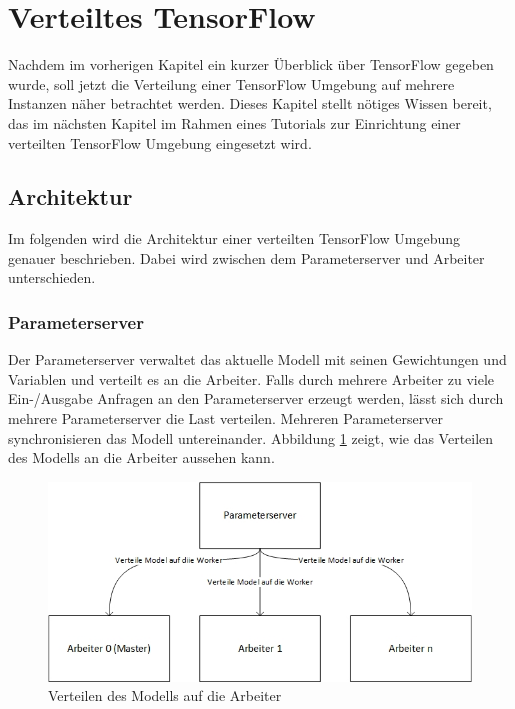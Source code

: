 \section{Verteiltes TensorFlow}
Nachdem im vorherigen Kapitel ein kurzer Überblick über TensorFlow gegeben wurde, soll jetzt die Verteilung einer TensorFlow Umgebung auf mehrere Instanzen näher betrachtet werden. Dieses Kapitel stellt nötiges Wissen bereit, das im nächsten Kapitel im Rahmen eines Tutorials zur Einrichtung einer verteilten TensorFlow Umgebung eingesetzt wird. 

\subsection{Architektur}
Im folgenden wird die Architektur einer verteilten TensorFlow Umgebung genauer beschrieben. Dabei wird zwischen dem Parameterserver und Arbeiter unterschieden.

\subsubsection{Parameterserver}
Der Parameterserver verwaltet das aktuelle Modell mit seinen Gewichtungen und Variablen und verteilt es an die Arbeiter. Falls durch mehrere Arbeiter zu viele Ein-/Ausgabe Anfragen an den Parameterserver erzeugt werden, lässt sich durch mehrere Parameterserver die Last verteilen. Mehreren Parameterserver synchronisieren das Modell untereinander. Abbildung \ref{fig:architektur-servemodel} zeigt, wie das Verteilen des Modells an die Arbeiter aussehen kann. 

\begin{figure}[h!]
	\centering
	\includegraphics[width=1\linewidth]{Pictures/Architektur-ServeModel}
	\caption[Verteilen des Modells auf die Arbeiter]{Verteilen des Modells auf die Arbeiter}
	\label{fig:architektur-servemodel}
\end{figure}

